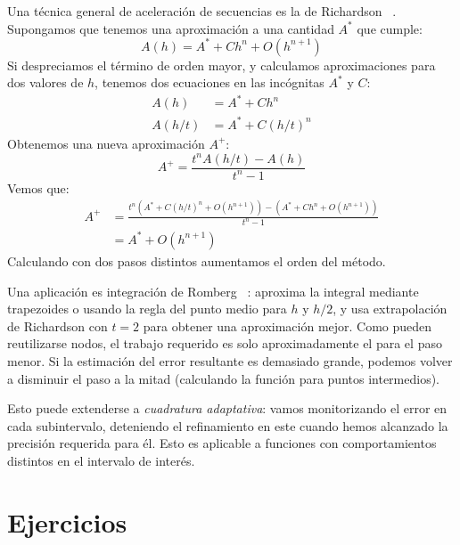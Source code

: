   Una técnica general de aceleración de secuencias es la de Richardson~%
    \cite{richardson11:_approx_arith_solut_finit_differ,
          richardson27:_deferred_approach_limit}.
  Supongamos que tenemos una aproximación a una cantidad \(A^*\)
  que cumple:
  \begin{equation}
    \label{eq:richardson-start}
    A(h)
      = A^* + C h^n + O(h^{n + 1})
  \end{equation}
  Si despreciamos el término de orden mayor,
  y calculamos aproximaciones para dos valores de \(h\),
  tenemos dos ecuaciones en las incógnitas \(A^*\) y \(C\):
  \begin{align*}
    A(h)
      &= A^* + C h^n \\
    A(h/t)
      &= A^* + C (h/t)^n
  \end{align*}
  Obtenemos una nueva aproximación \(A^+\):
  \begin{equation*}
    A^+
      = \frac{t^n A(h/t) - A(h)}{t^n - 1}
  \end{equation*}
  Vemos que:
  \begin{align*}
    A^+
      &= \frac{t^n (A^* + C (h/t)^n + O(h^{n + 1}))
                 - (A^* + C h^n + O(h^{n + 1}))}
              {t^n - 1} \\
      &= A^* + O(h^{n + 1})
  \end{align*}
  Calculando con dos pasos distintos aumentamos el orden del método.

  Una aplicación es integración de Romberg~%
    \cite{romberg55:_vereinfachte_integration}:
  aproxima la integral mediante trapezoides
  o usando la regla del punto medio
  para \(h\) y \(h/2\),
  y usa extrapolación de Richardson
  con \(t = 2\) para obtener una aproximación mejor.
  Como pueden reutilizarse nodos,
  el trabajo requerido es solo aproximadamente el para el paso menor.
  Si la estimación del error resultante es demasiado grande,
  podemos volver a disminuir el paso a la mitad
  (calculando la función para puntos intermedios).

  Esto puede extenderse a \emph{cuadratura adaptativa}:
  vamos monitorizando el error en cada subintervalo,
  deteniendo el refinamiento en este
  cuando hemos alcanzado la precisión requerida para él.
  Esto es aplicable a funciones con comportamientos distintos
  en el intervalo de interés.

\section*{Ejercicios}
\label{sec:ejercicios-06-previa}

